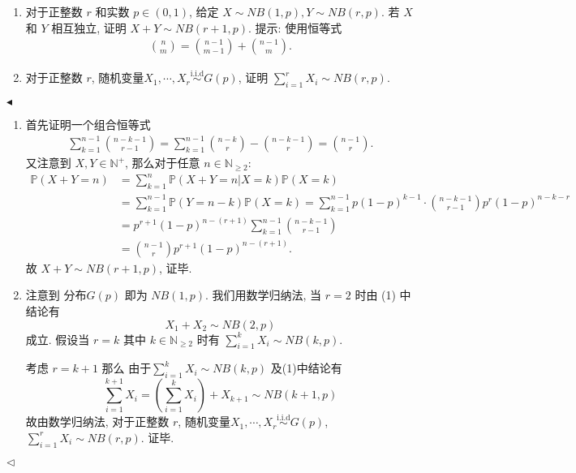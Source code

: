 \documentclass[11pt]{article}
\newenvironment{problem}[2][Problem]{\begin{trivlist}
    \item[\hskip \labelsep {\bfseries #1}\hskip \labelsep {\bfseries #2.}]\songti}{\hfill$\blacktriangleleft$\end{trivlist}}
\newenvironment{answer}[1][Solution]{\begin{trivlist}
    \item[\hskip \labelsep {\bfseries #1.}\hskip \labelsep]}{\hfill$\lhd$\end{trivlist}}
\newcommand\1{\mathds{1}}
\newcommand\N{\mathbb{N}}
\newcommand\PP{\mathbb{P}}
\newcommand{\iid}{\overset{\text{i.i.d}}{\sim}}
\begin{document}
\begin{problem}{5}
    \begin{enumerate}[label=(\arabic*)]
        \item 对于正整数 $r$ 和实数 $p\in (0,1)$, 给定 $X\sim NB(1,p), Y\sim NB(r,p)$. 若 $X$ 和 $Y$ 相互独立, 证明 $X+Y\sim NB(r+1,p)$. 
        {\kaishu 提示: 使用恒等式}
        \begin{align*}
            \binom{n}{m} = \binom{n-1}{m-1} + \binom{n-1}{m}.
        \end{align*}
        \item 对于正整数 $r$, 随机变量$X_1, \cdots, X_r \iid G(p)$, 证明 $\sum_{i=1}^{r}X_i \sim NB(r,p)$.
    \end{enumerate}
\end{problem}
\begin{answer}
\begin{enumerate}[label = (\arabic*)]
    \item 首先证明一个组合恒等式
    \begin{align*}
        \sum_{k=1}^{n-1} \binom{n-k-1}{r-1} = \sum_{k=1}^{n-1} \binom{n-k}{r} - \binom{n-k-1}{r} =\binom{n-1}{r}.
    \end{align*}  
    又注意到 $X,Y \in \N^+$, 那么对于任意 $n \in \N_{\ge 2}$: 
    \begin{align*}
        \PP(X + Y = n) &= \sum_{k=1}^{n} \PP(X+Y = n | X = k) \PP(X = k) \\
        &= \sum_{k=1}^{n-1} \PP(Y = n-k) \PP(X=k) = \sum_{k=1}^{n-1} p(1-p)^{k-1} \cdot \binom{n-k-1}{r-1} p^r(1-p)^{n-k-r} \\
        &= p^{r+1} (1-p)^{n-(r+1)} \sum_{k=1}^{n-1} \binom{n-k-1}{r-1} \\
        &= \binom{n-1}{r} p^{r+1} (1-p)^{n-(r+1)} .
    \end{align*}
    故 $X + Y\sim NB(r+1, p)$, 证毕.
    \item 注意到 分布$G(p)$ 即为 $NB(1, p)$. 我们用数学归纳法, 当 $r = 2$ 时由 (1) 中结论有 \[X_1 + X_2 \sim NB(2, p)\] 成立.  
    假设当 $r = k$ 其中 $k \in \N_{\ge 2}$ 时有 $\sum_{i=1}^{k}X_i \sim NB(k,p)$. 

    考虑 $r = k + 1$ 那么 由于$\sum_{i=1}^{k}X_i \sim NB(k,p)$ 及(1)中结论有 
    \[
        \sum_{i=1}^{k+1} X_i = \left(\sum_{i=1}^{k}X_i\right) + X_{k+1} \sim NB(k+1, p)
    \]
    故由数学归纳法, 对于正整数 $r$, 随机变量$X_1, \cdots, X_r \iid G(p)$,  $\sum_{i=1}^{r}X_i \sim NB(r,p)$. 证毕.
\end{enumerate}
\end{answer}
\end{document}
